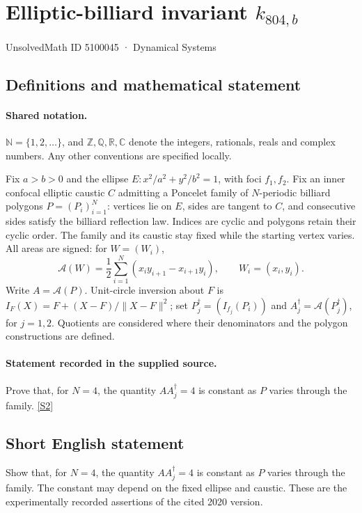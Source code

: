 \documentclass[11pt]{article}
\newcommand{\sref}[2]{\hyperlink{source:#1:#2}{[S#2]}}
\begin{document}
\setcounter{section}{5100044}
\section{Elliptic-billiard invariant $k_{804,b}$}\label{5100045}
{\small\sffamily UnsolvedMath ID 5100045 · Dynamical Systems}
\subsection{Definitions and mathematical statement}

\paragraph{Shared notation.}$\mathbb N=\{1,2,\ldots\}$, and $\mathbb Z,\mathbb Q,\mathbb R,\mathbb C$ denote the integers, rationals, reals and complex numbers. Any other conventions are specified locally.


Fix $a>b>0$ and the ellipse $E:x^2/a^2+y^2/b^2=1$, with foci $f_1,f_2$. Fix an inner confocal elliptic caustic $C$ admitting a Poncelet family of $N$-periodic billiard polygons $P=(P_i)_{i=1}^N$: vertices lie on $E$, sides are tangent to $C$, and consecutive sides satisfy the billiard reflection law. Indices are cyclic and polygons retain their cyclic order. The family and its caustic stay fixed while the starting vertex varies. All areas are signed: for $W=(W_i)$,
\[\mathcal A(W)=\frac12\sum_{i=1}^N(x_i y_{i+1}-x_{i+1}y_i),\qquad W_i=(x_i,y_i).\]
Write $A=\mathcal A(P)$. Unit-circle inversion about $F$ is $I_F(X)=F+(X-F)/\lVert X-F\rVert^2$; set $P_j^\dagger=(I_{f_j}(P_i))$ and $A_j^\dagger=\mathcal A(P_j^\dagger)$, for $j=1,2$. Quotients are considered where their denominators and the polygon constructions are defined.
\paragraph{Statement recorded in the supplied source.}
Prove that, for $N=4$, the quantity $AA_j^\dagger=4$ is constant as $P$ varies through the family. \sref{5100045}{2}
\subsection{Short English statement}
Show that, for $N=4$, the quantity $AA_j^\dagger=4$ is constant as $P$ varies through the family. The constant may depend on the fixed ellipse and caustic. These are the experimentally recorded assertions of the cited 2020 version.
\end{document}
